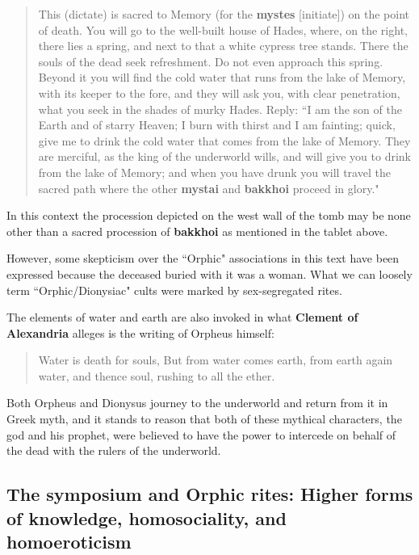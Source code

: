 \begin{quotation}
    This (dictate) is sacred to Memory (for the \textbf{mystes} [initiate]) on the point of death. You will go to the well-built house of Hades, where, on the right, there lies a spring, and next to that a white cypress tree stands. There the souls of the dead seek refreshment. Do not even approach this spring. Beyond it you will find the cold water that runs from the lake of Memory, with its keeper to the fore, and they will ask you, with clear penetration, what you seek in the shades of murky Hades. Reply: ``I am the son of the Earth and of starry Heaven; I burn with thirst and I am fainting; quick, give me to drink the cold water that comes from the lake of Memory. They are merciful, as the king of the underworld wills, and will give you to drink from the lake of Memory; and when you have drunk you will travel the sacred path where the other \textbf{mystai} and \textbf{bakkhoi} proceed in glory."
\end{quotation}

In this context the procession depicted on the west wall of the tomb may be none other than a sacred procession of \textbf{bakkhoi} as mentioned in the tablet above.

However, some skepticism over the ``Orphic" associations in this text have been expressed because the deceased buried with it was a woman. What we can loosely term ``Orphic/Dionysiac" cults were marked by sex-segregated rites.

The elements of water and earth are also invoked in what \textbf{Clement of Alexandria} alleges is the writing of Orpheus himself:

\begin{quotation}
    Water is death for souls, But from water comes earth, from earth again water, and thence soul, rushing to all the ether.
\end{quotation}

Both Orpheus and Dionysus journey to the underworld and return from it in Greek myth, and it stands to reason that both of these mythical characters, the god and his prophet, were believed to have the power to intercede on behalf of the dead with the rulers of the underworld.

\subsection{The symposium and Orphic rites: Higher forms of knowledge, homosociality, and homoeroticism}

